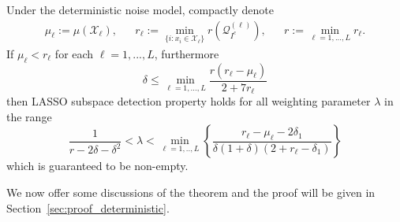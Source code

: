 \documentclass{ctexart}
\begin{document}
\begin{theorem}\label{thm:thm_general}
Under the deterministic noise model, compactly denote
\begin{align*}
\mu_{\ell}:=\mu(\mathcal{X}_{\ell}),&& r_{\ell}:=\min_{\{i: x_i\in \mathcal{X}_{\ell}\}}r(\mathcal{Q}^{(\ell)}_{I^c}),&&
   r:=\min_{\ell=1,...,L} r_{\ell}.
\end{align*}
If $\mu_{\ell}< r_{\ell}$ for each $\ell = 1,...,L$, furthermore
$$ \delta\leq \min_{\ell=1,...,L}\frac{r(r_{\ell}-\mu_{\ell})}{2+7r_{\ell}} $$
then LASSO subspace detection property holds for all weighting parameter $\lambda$ in the range
\begin{equation*}
\frac{1}{r - 2\delta-\delta^2}<
        \lambda<\min_{\ell=1,..,L}\left\{\frac{r_{\ell}-\mu_{\ell}-2\delta_1}{\delta(1+\delta)(2+r_{\ell}-\delta_1)}\right\}
\end{equation*}
which is guaranteed to be non-empty.
\end{theorem}
We now offer some discussions of the theorem and the proof will be given in  Section~\ref{sec:proof_deterministic}.
\end{document}
